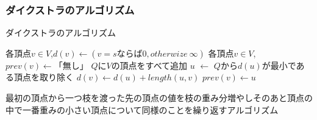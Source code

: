 \documentclass[a4j,10.5pt]{jarticle}
\begin{document}
\subsubsection*{ダイクストラのアルゴリズム}

\begin{algorithm}
\caption{ダイクストラのアルゴリズム}
\begin{algorithmic}[1]
\STATE 各頂点$v \in V$,$d(v)\leftarrow(v = s ならば 0,otherwize \ \infty)$
\STATE 各頂点$v \in V$,$prev(v) \leftarrow 「無し」$
\STATE $Q$に$V$の頂点をすべて追加
\STATE $u$ $\leftarrow$ $Q$から$d(u)$が最小である頂点を取り除く
\STATE $d(v) \leftarrow d(u) + length(u,v)$
\STATE $prev(v) \leftarrow u$ 
\ENDIF
\ENDFOR
\ENDWHILE
\end{algorithmic}
\end{algorithm}

最初の頂点から一つ枝を渡った先の頂点の値を枝の重み分増やしそのあと頂点の中で一番重みの小さい頂点について同様のことを繰り返すアルゴリズム
\end{document}
